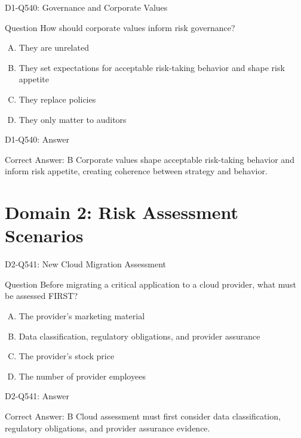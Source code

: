 \documentclass{beamer}
\begin{document}
\begin{frame}{D1-Q540: Governance and Corporate Values}
	\begin{block}{Question}
		How should corporate values inform risk governance?
	\end{block}
	\begin{enumerate}[(A)]
		\item They are unrelated
		\item They set expectations for acceptable risk-taking behavior and shape risk appetite
		\item They replace policies
		\item They only matter to auditors
	\end{enumerate}
\end{frame}
\begin{frame}{D1-Q540: Answer}
	\begin{block}{Correct Answer: B}
		Corporate values shape acceptable risk-taking behavior and inform risk appetite, creating coherence between strategy and behavior.
	\end{block}
\end{frame}

\section{Domain 2: Risk Assessment Scenarios}

\begin{frame}{D2-Q541: New Cloud Migration Assessment}
	\begin{block}{Question}
		Before migrating a critical application to a cloud provider, what must be assessed FIRST?
	\end{block}
	\begin{enumerate}[(A)]
		\item The provider's marketing material
		\item Data classification, regulatory obligations, and provider assurance
		\item The provider's stock price
		\item The number of provider employees
	\end{enumerate}
\end{frame}
\begin{frame}{D2-Q541: Answer}
	\begin{block}{Correct Answer: B}
		Cloud assessment must first consider data classification, regulatory obligations, and provider assurance evidence.
	\end{block}
\end{frame}
\end{document}
